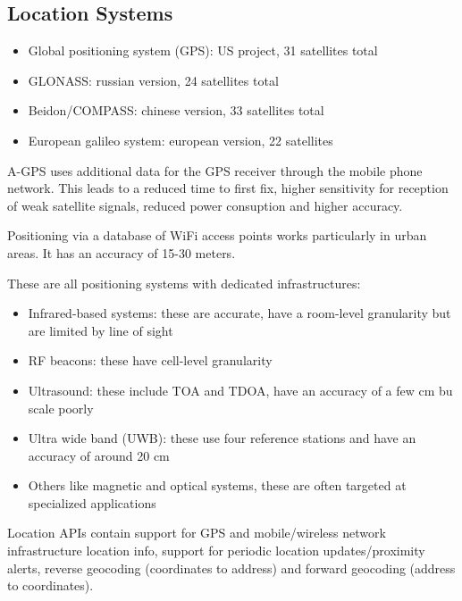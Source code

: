 \subsection{Location Systems}
\begin{mytitle}\hfill
\begin{itemize}
    \item Global positioning system (GPS): US project, 31 satellites total
    \item GLONASS: russian version, 24 satellites total
    \item Beidon/COMPASS: chinese version, 33 satellites total
    \item European galileo system: european version, 22 satellites
\end{itemize}
\end{mytitle}
\begin{mytitle} A-GPS uses additional data for the GPS receiver through the mobile phone network. This leads to a reduced time to first fix, higher sensitivity for reception of weak satellite signals, reduced power consuption and higher accuracy.
\end{mytitle}
\begin{mytitle} Positioning via a database of WiFi access points works particularly in urban areas. It has an accuracy of 15-30 meters.
\end{mytitle}
\begin{mytitle} These are all positioning systems with dedicated infrastructures:
\begin{itemize}
    \item Infrared-based systems: these are accurate, have a room-level granularity but are limited by line of sight
    \item RF beacons: these have cell-level granularity
    \item Ultrasound: these include TOA and TDOA, have an accuracy of a few cm bu scale poorly
    \item Ultra wide band (UWB): these use four reference stations and have an accuracy of around 20 cm
    \item Others like magnetic and optical systems, these are often targeted at specialized applications
\end{itemize}
\end{mytitle}
\begin{mytitle} Location APIs contain support for GPS and mobile/wireless network infrastructure location info, support for periodic location updates/proximity alerts, reverse geocoding (coordinates to address) and forward geocoding (address to coordinates).
\end{mytitle}